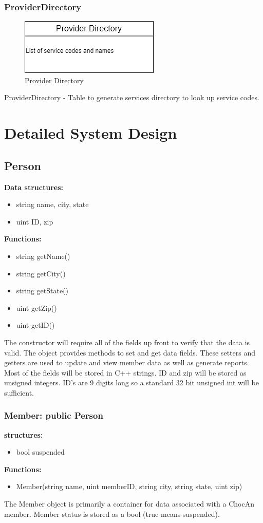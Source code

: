 \documentclass{article}
\begin{document}
\subsubsection{ProviderDirectory}
  \begin{figure}[h!]
	\centering
	\includegraphics[width=0.3\linewidth]{providerDirectory.png}
	\caption[Provider Directory]{Provider Directory}
	\label{fig:P1compileP0-1}
  \end{figure}
ProviderDirectory - Table to generate services directory to look up service codes.

\section{Detailed System Design}
\subsection{Person}
\textbf{Data structures:}
\begin{itemize}
   \item string name, city, state
   \item uint ID, zip
\end{itemize}
\textbf{Functions:}
\begin{itemize}
   \item string getName()
   \item string getCity()
   \item string getState()
   \item uint getZip()
   \item uint getID()
\end{itemize}
The constructor will require all of the fields up front to verify that the data is valid. The object provides methods to set and get data fields. These setters and getters are used to update and view member data as well as generate reports. Most of the fields will be stored in C++ strings. ID and zip will be stored as unsigned integers. ID’s are 9 digits long so a standard 32 bit unsigned int will be sufficient.

\subsubsection{Member: public Person}
\textbf{structures:}
\begin{itemize}
   \item bool suspended
\end{itemize}
\textbf{Functions:}
\begin{itemize}
   \item Member(string name, uint memberID, string city, string state, uint zip)
\end{itemize}
The Member object is primarily a container for data associated with a ChocAn member. Member status is stored as a bool (true means suspended). 
\end{document}
